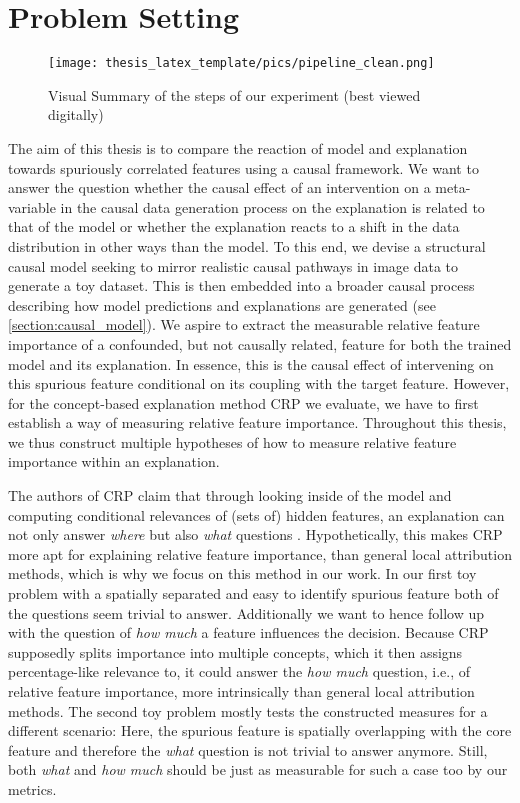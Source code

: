 \chapter{Problem Setting}\label{chapter:problem_setting}

\begin{figure}[h!]
    \texttt{[image: thesis\_latex\_template/pics/pipeline\_clean.png]}%
    \caption[Experiment Pipeline]{Visual Summary of the steps of our experiment (best viewed digitally)}
    \label{fig:pipeline}
\end{figure}

The aim of this thesis is to compare the reaction of model and explanation towards spuriously correlated features using a causal framework.
We want to answer the question whether the causal effect of an intervention on a meta-variable in the causal data generation process on the explanation is related to that of the model or whether the explanation reacts to a shift in the data distribution in other ways than the model. 
To this end, we devise a structural causal model seeking to mirror realistic causal pathways in image data to generate a toy dataset. This is then embedded into a broader causal process describing how model predictions and explanations are generated (see \cref{section:causal_model}).
We aspire to extract the measurable relative feature importance of a confounded, but not causally related, feature for both the trained model and its explanation. In essence, this is the causal effect of intervening on this spurious feature conditional on its coupling with the target feature. However, for the concept-based explanation method CRP we evaluate, we have to first establish a way of measuring relative feature importance. 
Throughout this thesis, we thus construct multiple hypotheses of how to measure relative feature importance within an explanation.

The authors of CRP claim that through looking inside of the model and computing conditional relevances of (sets of) hidden features, an explanation can not only answer \textit{where} but also \textit{what} questions \citep{Achtibat2022}. Hypothetically, this makes CRP more apt for explaining relative feature importance, than general local attribution methods, which is why we focus on this method in our work.
In our first toy problem with a spatially separated and easy to identify spurious feature both of the questions seem trivial to answer. Additionally we want to hence follow up with the question of \textit{how much} a feature influences the decision. Because CRP supposedly splits importance into multiple concepts, which it then assigns percentage-like relevance to, it could answer the \textit{how much} question, i.e., of relative feature importance, more intrinsically than general local attribution methods. The second toy problem mostly tests the constructed measures for a different scenario: Here, the spurious feature is spatially overlapping with the core feature and therefore the \textit{what} question is not trivial to answer anymore. Still, both \textit{what} and \textit{how much} should be just as measurable for such a case too by our metrics.

